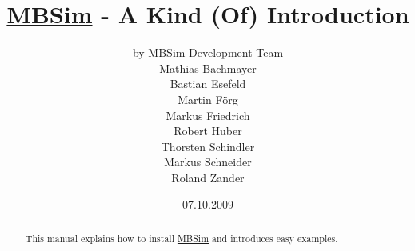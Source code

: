 \documentclass[fleqn,11pt]{article}
\newcommand{\MBSim}{\href{http://mbsim.berlios.de}{\textsf{MBSim}}}
\begin{document}
\title{\MBSim{} - A Kind (Of) Introduction}
\author{by \MBSim{} Development Team\\
  Mathias Bachmayer\\
  Bastian Esefeld\\
  Martin F\"org\\
  Markus Friedrich\\
  Robert Huber\\
  Thorsten Schindler\\
  Markus Schneider\\
  Roland Zander}
\date{07.10.2009}
\maketitle

\begin{abstract}
  This manual explains how to install \MBSim{} and introduces easy examples.
\end{abstract}

\noindent\hrulefill
\tableofcontents






\appendix





\end{document}

